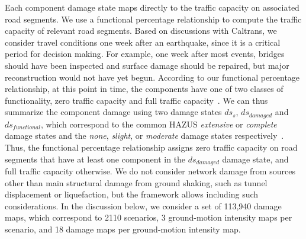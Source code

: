 
Each component damage state maps directly to the traffic capacity on associated road segments. We use a functional percentage relationship to compute the traffic capacity of relevant road segments. Based on discussions with Caltrans, we consider travel conditions one week after an earthquake, since it is a critical period for decision making. For example, one week after most events, bridges should have been inspected and surface damage should be repaired, but major reconstruction would not have yet begun. According to our functional percentage relationship, at this point in time, the components have one of two classes of functionality, zero traffic capacity and full traffic capacity~\cite{werner_redars_2006}. We can thus summarize the component damage using two damage states $ds_s$, $ds_{damaged}$ and $ds_{functional}$, which correspond to the common HAZUS \emph{extensive} or \emph{complete} damage states and the \emph{none}, \emph{slight}, or \emph{moderate} damage states respectively~\cite{werner_redars_2006}. Thus, the functional percentage relationship assigns zero traffic capacity on road segments that have at least one component in the $ds_{damaged}$ damage state, and full traffic capacity otherwise.  We do not consider network damage from sources other than main structural damage from ground shaking, such as tunnel displacement or liquefaction, but the framework allows including such considerations. In the discussion below, we consider a set of 113,940 damage maps, which correspond to 2110 scenarios, 3 ground-motion intensity maps per scenario, and 18 damage maps per ground-motion intensity map. 





